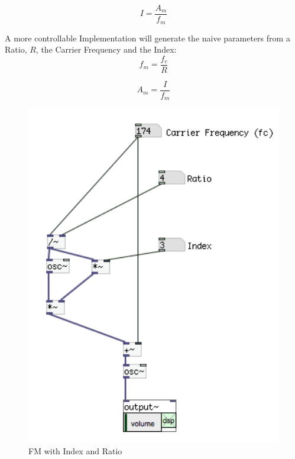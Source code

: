 \begin{mdframed}[backgroundcolor=black!10,rightline=false,leftline=false]

\begin{equation}
I = \frac{A_m}{f_m}
\end{equation}

A more controllable Implementation will generate the naive parameters from a Ratio, ${R}$, the Carrier Frequency and the Index:
\begin{equation}
	f_m = \frac{f_c}{R}
\end{equation}

\begin{equation}
	A_m = \frac{I}{f_m}
\end{equation}

\begin{figure}[H]
	\begin{center}
		\includegraphics[width = 14cm]{img/FMcorrect.png}
		\caption{FM with Index and Ratio}
		\label{fig:fmComplete}
	\end{center}
\end{figure}

\end{mdframed}

